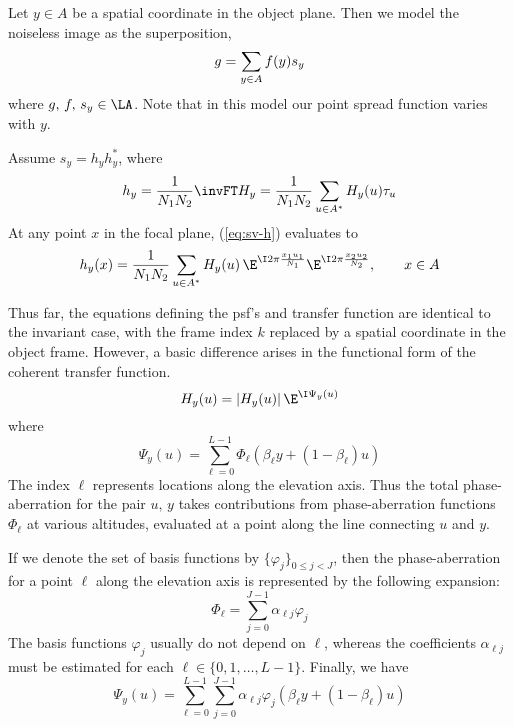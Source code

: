 Let 
    $y \in A$ %
be a spatial coordinate in the object plane.
Then we model the noiseless image as the superposition, 
\begin{equation}\label{eq:sv-g}
g = \sum_{y \in \groupA}f(y)s_y%
\end{equation}
where $g,\, f, \, s_y \in \LA$.  Note that in this model our point spread
function varies with $y$. 

Assume $s_y = h_y h_y^*$, where
\begin{equation}\label{eq:sv-h}
h_y = \frac{1}{N_1N_2} \invFT H_y = \frac{1}{N_1N_2} \sum_{u\in \groupA^*} H_y(u)\tau_u
\end{equation}  
At any point $x$ in the focal plane, (\ref{eq:sv-h}) evaluates to 
\[
h_y(x) = 
\frac{1}{N_1N_2} \sum_{u\in \groupA^*} H_y(u)\,\E^{\I 2\pi \frac{x_1u_1}{N_1}}\E^{\I 2\pi \frac{x_2u_2}{N_2}}, \qquad x \in \groupA
\]


Thus far, the equations defining the psf's and transfer function are identical
to the invariant case, with the frame index $k$ replaced by a spatial
coordinate in the object frame.  However, a basic difference arises in the
functional form of the coherent transfer function.
\begin{equation}\label{eq:sv-H}
H_y(u) = |H_y(u)|\,\E^{\I \Psi_y(u)}
\end{equation}
where 
\[
\Psi_y(u) = \sum_{\ell=0}^{L-1} \Phi_{\ell}(\beta_{\ell}y + (1-\beta_{\ell})u)
\]
The index $\ell$ represents locations along the elevation axis.  Thus the
total phase-aberration for the pair $u, \, y$ takes contributions 
from phase-aberration functions $\Phi_{\ell}$ at various altitudes, evaluated
at a point along the line connecting $u$ and $y$.

If we denote the set of basis functions by $\{\varphi_j\}_{0\leq j < J}$, then the
phase-aberration for a point $\ell$ along the elevation axis is represented by the
following expansion:
\[
\Phi_{\ell} = \sum_{j=0}^{J-1} \alpha_{\ell j} \varphi_j
\]
The basis functions $\varphi_j$ usually do not depend on
$\ell$, whereas the coefficients $\alpha_{\ell j}$ must be
estimated for each $\ell \in \{0, 1, \ldots, L-1\}$.
Finally, we have 
\begin{equation}\label{eq:sv-abberation}
\Psi_y(u) = \sum_{\ell=0}^{L-1} \sum_{j=0}^{J-1} \alpha_{\ell j} \varphi_j(\beta_{\ell}y + (1-\beta_{\ell})u)
\end{equation}

